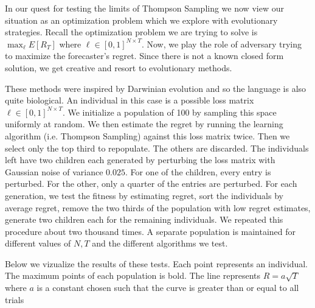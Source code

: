 \documentclass[10pt,a4paper]{article} %
\begin{document}
	In our quest for testing the limits of Thompson Sampling we now view our situation as an optimization problem which we explore with evolutionary strategies.  Recall the optimization problem we are trying to solve is $ \max_\ell E [R_T] $ where $\ell \in \left[ 0, 1 \right]^{N \times T} $.  Now, we play the role of adversary trying to maximize the forecaster's regret.  Since there is not a known closed form solution, we get creative and resort to evolutionary methods.
		
	These methods were inspired by Darwinian evolution and so the language is also quite biological.  An individual in this case is a possible loss matrix $\ell \in \left[ 0, 1 \right]^{N \times T} $.  We initialize a population of 100 by sampling this space uniformly at random.  We then estimate the regret by running the learning algorithm (i.e. Thompson Sampling) against this loss matrix twice.  Then we select only the top third to repopulate.  The others are discarded.  The individuals left have two children each generated by perturbing the loss matrix with Gaussian noise of variance $0.025$.  For one of the children, every entry is perturbed. For the other, only a quarter of the entries are perturbed.  For each generation, we test the fitness by estimating regret, sort the individuals by average regret, remove the two thirds of the population with low regret estimates, generate two children each for the remaining individuals.  We repeated this procedure about two thousand times.  A separate population is maintained for different values of $N, T$ and the different algorithms we test.
		
	Below we vizualize the results of these tests.  Each point represents an individual.  The maximum points of each population is bold.  The line represents $R = a \sqrt{T}$ where $a$ is a constant chosen such that the curve is greater than or equal to all trials 
	
		
	\begin{figure}[h!]
	\end{figure}
\end{document}

